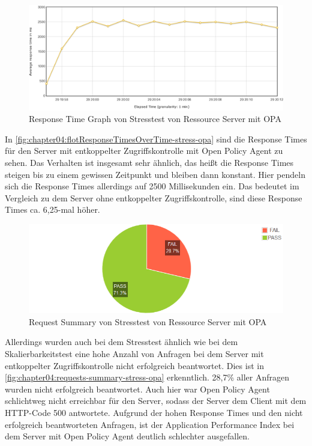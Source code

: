 \begin{figure}[H]
  \centering
  \includegraphics[width=1.0\textwidth]{gfx/flotResponseTimesOverTime-stress-opa.png}
  \caption{Response Time Graph von Stresstest von Ressource Server mit OPA}
  \label{fig:chapter04:flotResponseTimesOverTime-stress-opa}
\end{figure}

In \autoref{fig:chapter04:flotResponseTimesOverTime-stress-opa} sind die Response Times für den Server mit entkoppelter Zugriffskontrolle mit Open Policy Agent zu sehen. Das Verhalten ist insgesamt sehr ähnlich, das heißt die Response Times steigen bis zu einem gewissen Zeitpunkt und bleiben dann konstant. Hier pendeln sich die Response Times allerdings auf 2500 Millisekunden ein. Das bedeutet im Vergleich zu dem Server ohne entkoppelter Zugriffskontrolle, sind diese Response Times ca. 6,25-mal höher. 

\begin{figure}[H]
  \centering
  \includegraphics[width=1.0\textwidth]{gfx/requests-summary-stress-opa.png}
  \caption{Request Summary von Stresstest von Ressource Server mit OPA}
  \label{fig:chapter04:requests-summary-stress-opa}
\end{figure}

Allerdings wurden auch bei dem Stresstest ähnlich wie bei dem Skalierbarkeitstest eine hohe Anzahl von Anfragen bei dem Server mit entkoppelter Zugriffskontrolle nicht erfolgreich beantwortet. Dies ist in \autoref{fig:chapter04:requests-summary-stress-opa} erkenntlich. 28,7\% aller Anfragen wurden nicht erfolgreich beantwortet. Auch hier war Open Policy Agent schlichtweg nicht erreichbar für den Server, sodass der Server dem Client mit dem HTTP-Code 500 antwortete.
Aufgrund der hohen Response Times und den nicht erfolgreich beantworteten Anfragen, ist der Application Performance Index bei dem Server mit Open Policy Agent deutlich schlechter ausgefallen. 

